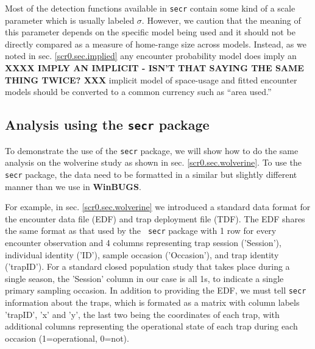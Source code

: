 Most of the detection functions available in \mbox{\tt secr} contain
some kind of a scale parameter which is usually labeled
$\sigma$. However, we caution that the meaning of this parameter
depends on the specific model being used and it should not be directly
compared as a measure of home-range size across models. Instead, as we
noted in sec. \ref{scr0.sec.implied} any encounter probability model
does imply an {\bf XXXX IMPLY AN IMPLICIT - ISN'T THAT SAYING THE SAME THING TWICE? XXX}
implicit model of space-usage and fitted encounter models should be
converted to a common currency such as ``area used.'' 


\subsection{Analysis using the \mbox{\tt secr} package}

To demonstrate the use of the \mbox{\tt secr} package, we will show
how to do the same analysis on the wolverine study as shown in
sec. \ref{scr0.sec.wolverine}. To use the \mbox{\tt secr} package, the
data need to be formatted in a similar but slightly different manner
than we use in {\bf WinBUGS}.

For example, in sec. \ref{scr0.sec.wolverine} we introduced a standard
data format for the encounter data file (EDF) and trap deployment file
(TDF). The EDF shares the same format as that used by the \mbox{\tt
  secr} package with 1 row for every encounter observation and 4 columns representing 
trap session ('Session'), individual identity ('ID'), sample occasion
('Occasion'), and trap identity ('trapID').
For a standard closed population study that takes place during a
single season, the 'Session' column
in our case is all 1s, to indicate a single primary sampling
occasion. 
In addition to providing the EDF,  we must tell \mbox{\tt secr}
information about the traps, which is formated as a matrix with column labels
'trapID', 'x' and 'y', the last two being the coordinates of each
trap, with additional columns representing the operational state of
each trap during each occasion (1=operational, 0=not). 

